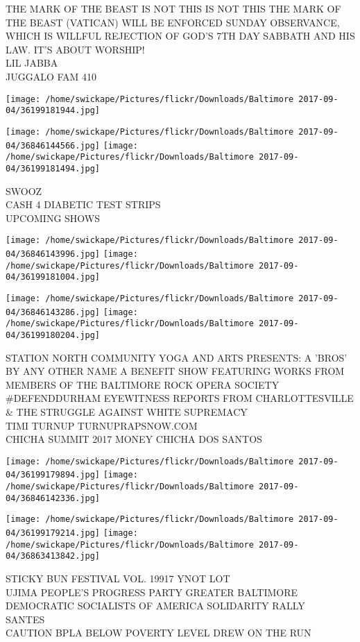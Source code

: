 \documentclass[10pt,letterpaper]{article}
\begin{document}
THE MARK OF THE BEAST IS NOT THIS IS NOT THIS THE MARK OF THE BEAST (VATICAN) WILL BE ENFORCED SUNDAY OBSERVANCE, WHICH IS WILLFUL REJECTION OF GOD'S 7TH DAY SABBATH AND HIS LAW.  IT'S ABOUT WORSHIP!\\
LIL JABBA\\
JUGGALO FAM 410
\pagebreak

\texttt{[image: /home/swickape/Pictures/flickr/Downloads/Baltimore 2017-09-04/36199181944.jpg]}

\vspace{0.25in}
\texttt{[image: /home/swickape/Pictures/flickr/Downloads/Baltimore 2017-09-04/36846144566.jpg]}
\texttt{[image: /home/swickape/Pictures/flickr/Downloads/Baltimore 2017-09-04/36199181494.jpg]}

SWOOZ\\
CASH 4 DIABETIC TEST STRIPS\\
UPCOMING SHOWS
\pagebreak

\texttt{[image: /home/swickape/Pictures/flickr/Downloads/Baltimore 2017-09-04/36846143996.jpg]}
\texttt{[image: /home/swickape/Pictures/flickr/Downloads/Baltimore 2017-09-04/36199181004.jpg]}

\texttt{[image: /home/swickape/Pictures/flickr/Downloads/Baltimore 2017-09-04/36846143286.jpg]}
\texttt{[image: /home/swickape/Pictures/flickr/Downloads/Baltimore 2017-09-04/36199180204.jpg]}

STATION NORTH COMMUNITY YOGA AND ARTS PRESENTS: A 'BROS' BY ANY OTHER NAME A BENEFIT SHOW FEATURING WORKS FROM MEMBERS OF THE BALTIMORE ROCK OPERA SOCIETY\\
\#DEFENDDURHAM EYEWITNESS REPORTS FROM CHARLOTTESVILLE \& THE STRUGGLE AGAINST WHITE SUPREMACY\\
TIMI TURNUP TURNUPRAPSNOW.COM\\
CHICHA SUMMIT 2017 MONEY CHICHA DOS SANTOS
\pagebreak

\texttt{[image: /home/swickape/Pictures/flickr/Downloads/Baltimore 2017-09-04/36199179894.jpg]}
\texttt{[image: /home/swickape/Pictures/flickr/Downloads/Baltimore 2017-09-04/36846142336.jpg]}

\texttt{[image: /home/swickape/Pictures/flickr/Downloads/Baltimore 2017-09-04/36199179214.jpg]}
\texttt{[image: /home/swickape/Pictures/flickr/Downloads/Baltimore 2017-09-04/36863413842.jpg]}

STICKY BUN FESTIVAL VOL. 19917 YNOT LOT\\
UJIMA PEOPLE'S PROGRESS PARTY GREATER BALTIMORE DEMOCRATIC SOCIALISTS OF AMERICA SOLIDARITY RALLY\\
SANTES\\
CAUTION BPLA BELOW POVERTY LEVEL DREW ON THE RUN
\pagebreak
\end{document}
